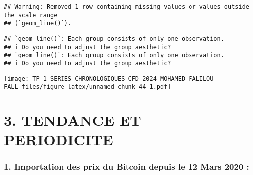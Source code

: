 \documentclass[
]{article}
\newenvironment{Shaded}{\begin{snugshade}}{\end{snugshade}}
\newcommand{\AttributeTok}[1]{\textcolor[rgb]{0.13,0.29,0.53}{#1}}
\newcommand{\DecValTok}[1]{\textcolor[rgb]{0.00,0.00,0.81}{#1}}
\newcommand{\FunctionTok}[1]{\textcolor[rgb]{0.13,0.29,0.53}{\textbf{#1}}}
\newcommand{\NormalTok}[1]{#1}
\newcommand{\OtherTok}[1]{\textcolor[rgb]{0.56,0.35,0.01}{#1}}
\newcommand{\SpecialCharTok}[1]{\textcolor[rgb]{0.81,0.36,0.00}{\textbf{#1}}}
\newcommand{\StringTok}[1]{\textcolor[rgb]{0.31,0.60,0.02}{#1}}
\begin{document}
\begin{verbatim}
## Warning: Removed 1 row containing missing values or values outside the scale range
## (`geom_line()`).
\end{verbatim}

\begin{verbatim}
## `geom_line()`: Each group consists of only one observation.
## i Do you need to adjust the group aesthetic?
## `geom_line()`: Each group consists of only one observation.
## i Do you need to adjust the group aesthetic?
\end{verbatim}

\texttt{[image: TP-1-SERIES-CHRONOLOGIQUES-CFD-2024-MOHAMED-FALILOU-FALL\_files/figure-latex/unnamed-chunk-44-1.pdf]}

\section{3. TENDANCE ET PERIODICITE}\label{tendance-et-periodicite}

\subsubsection{1. Importation des prix du Bitcoin depuis le 12 Mars 2020
:}\label{importation-des-prix-du-bitcoin-depuis-le-12-mars-2020}

\begin{Shaded}
\end{Shaded}
\end{document}
